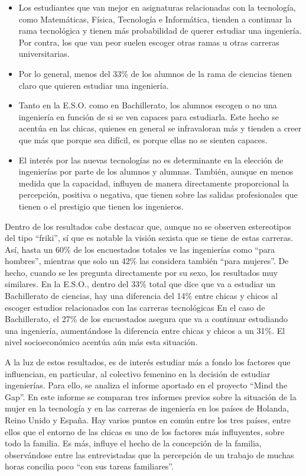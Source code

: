 \documentclass[runningheads,a4paper]{llncs}
\begin{document}
\begin{itemize}
  \item Los estudiantes que van mejor en asignaturas relacionadas con la tecnología, como Matemáticas, Física, Tecnología e Informática, tienden a continuar la rama tecnológica y tienen más probabilidad de querer estudiar una ingeniería. Por contra, los que van peor suelen escoger otras ramas u otras carreras universitarias.
  \item Por lo general, menos del 33\% de los alumnos de la rama de ciencias tienen claro que quieren estudiar una ingeniería.
  \item Tanto en la E.S.O. como en Bachillerato, los alumnos escogen o no una ingeniería en función de si se ven capaces para estudiarla. Este hecho se acentúa en las chicas, quienes en general se infravaloran más y tienden a creer que más que porque sea difícil, es porque ellas no se sienten capaces.
  \item El interés por las nuevas tecnologías no es determinante en la elección de ingenierías por parte de los alumnos y alumnas. También, aunque en menos medida que la capacidad, influyen de manera directamente proporcional la percepción, positiva o negativa, que tienen sobre las salidas profesionales que tienen o el prestigio que tienen los ingenieros.
\end{itemize}

Dentro de los resultados cabe destacar que, aunque no se observen estereotipos del tipo ``friki'', sí que es notable la visión sexista que se tiene de estas carreras. Así, hasta un 60\% de los encuestados totales ve las ingenierías como ``para hombres'', mientras que solo un 42\% las considera también ``para mujeres''. De hecho, cuando se les pregunta directamente por su sexo, los resultados muy similares. En la E.S.O., dentro del 33\% total que dice que va a estudiar un Bachillerato de ciencias, hay una diferencia del 14\% entre chicas y chicos al escoger estudios relacionados con las carreras tecnológicas En el caso de Bachillerato, el 27\% de los encuestados asegura que va a continuar estudiando una ingeniería, aumentándose la diferencia entre chicas y chicos a un 31\%. El nivel socioeconómico acentúa aún más esta situación.

A la luz de estos resultados, es de interés estudiar más a fondo los factores que influencian, en particular, al colectivo femenino en la decisión de estudiar ingenierías. Para ello, se analiza el informe aportado en el proyecto ``Mind the Gap''. En este informe \cite{mtg2015} se comparan tres informes previos sobre la situación de la mujer en la tecnología y en las carreras de ingeniería en los países de Holanda, Reino Unido y España.
Hay varios puntos en común entre los tres países, entre ellos que el entorno de las chicas es uno de los factores más influyentes, sobre todo la familia. Es más, influye el hecho de la concepción de la familia, observándose entre las entrevistadas que la percepción de un trabajo de muchas horas concilia poco ``con sus tareas familiares''.
\end{document}
